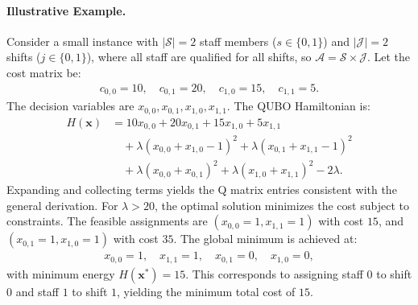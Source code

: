 \documentclass[12pt]{article}
\begin{document}
\paragraph{Illustrative Example.}
Consider a small instance with $|\mathcal{S}| = 2$ staff members ($s \in \{0,1\}$) and $|\mathcal{J}| = 2$ shifts ($j \in \{0,1\}$), where all staff are qualified for all shifts, so $\mathcal{A} = \mathcal{S} \times \mathcal{J}$. Let the cost matrix be:
\begin{align}
    c_{0,0} = 10, \quad c_{0,1} = 20, \quad c_{1,0} = 15, \quad c_{1,1} = 5.
\end{align}
The decision variables are $x_{0,0}, x_{0,1}, x_{1,0}, x_{1,1}$. The QUBO Hamiltonian is:
\begin{align}
    H(\mathbf{x}) &= 10 x_{0,0} + 20 x_{0,1} + 15 x_{1,0} + 5 x_{1,1} \nonumber \\
    &\quad + \lambda (x_{0,0} + x_{1,0} - 1)^2 + \lambda (x_{0,1} + x_{1,1} - 1)^2 \nonumber \\
    &\quad + \lambda (x_{0,0} + x_{0,1})^2 + \lambda (x_{1,0} + x_{1,1})^2 - 2\lambda.
\end{align}
Expanding and collecting terms yields the Q matrix entries consistent with the general derivation. For $\lambda > 20$, the optimal solution minimizes the cost subject to constraints. The feasible assignments are $(x_{0,0}=1, x_{1,1}=1)$ with cost $15$, and $(x_{0,1}=1, x_{1,0}=1)$ with cost $35$. The global minimum is achieved at:
\begin{align}
    x_{0,0} = 1, \quad x_{1,1} = 1, \quad x_{0,1} = 0, \quad x_{1,0} = 0,
\end{align}
with minimum energy $H(\mathbf{x}^*) = 15$. This corresponds to assigning staff $0$ to shift $0$ and staff $1$ to shift $1$, yielding the minimum total cost of $15$.
\end{document}
